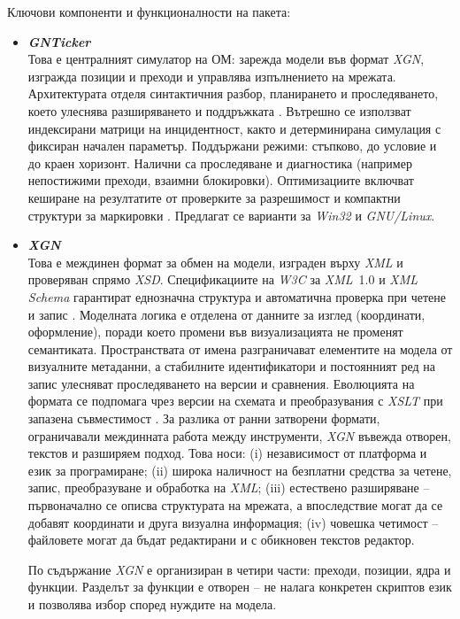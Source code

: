 \begin{itemize}
Ключови компоненти и функционалности на пакета:
\begin{itemize}[itemsep=0.5em]
	\item \textbf{\textit{GNTicker}}\\
	Това е централният симулатор на ОМ: зарежда модели във формат \textit{XGN}, изгражда позиции и преходи и управлява изпълнението на мрежата. Архитектурата отделя синтактичния разбор, планирането и проследяването, което улеснява разширяването и поддръжката \cite{Trifonov2005}. Вътрешно се използват индексирани матрици на инцидентност, както и детерминирана симулация с фиксиран начален параметър. Поддържани режими: стъпково, до условие и до краен хоризонт. Налични са проследяване и диагностика (например непостижими преходи, взаимни блокировки). Оптимизациите включват кеширане на резултатите от проверките за разрешимост и компактни структури за маркировки \cite{Dimitrov2011}. Предлагат се варианти за \textit{Win32} и \textit{GNU/Linux}.

	
	
	\item \textbf{\textit{XGN}}\\
	Това е междинен формат за обмен на модели, изграден върху \textit{XML} и проверяван спрямо \textit{XSD}. Спецификациите на \textit{W3C} за \textit{XML}~1.0 и \textit{XML Schema} гарантират еднозначна структура и автоматична проверка при четене и запис \cite{W3CXML,W3CXSD}. Моделната логика е отделена от данните за изглед (координати, оформление), поради което промени във визуализацията не променят семантиката. Пространствата от имена разграничават елементите на модела от визуалните метаданни, а стабилните идентификатори и постоянният ред на запис улесняват проследяването на версии и сравнения. Еволюцията на формата се подпомага чрез версии на схемата и преобразувания с \textit{XSLT} при запазена съвместимост \cite{Trifonov2008}.
	За разлика от ранни затворени формати, ограничавали междинната работа между инструменти, \textit{XGN} въвежда отворен, текстов и разширяем подход. Това носи: (i) независимост от платформа и език за програмиране; (ii) широка наличност на безплатни средства за четене, запис, преобразуване и обработка на \textit{XML}; (iii) естествено разширяване -- първоначално се описва структурата на мрежата, а впоследствие могат да се добавят координати и друга визуална информация; (iv) човешка четимост -- файловете могат да бъдат редактирани и с обикновен текстов редактор.
	
	По съдържание \textit{XGN} е организиран в четири части: преходи, позиции, ядра и функции. Разделът за функции е отворен -- не налага конкретен скриптов език и позволява избор според нуждите на модела.
	

\end{itemize}
\end{itemize}
